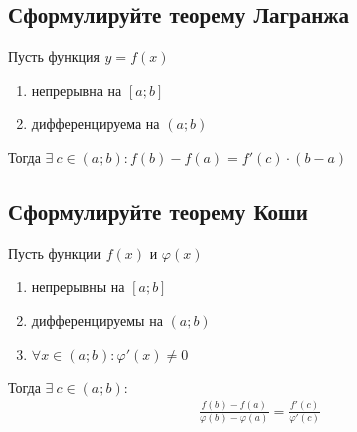 \subsection{Сформулируйте теорему Лагранжа}
\begin{theorem}
	Пусть функция $y=f(x)$
	\begin{enumerate}
		\item непрерывна на $[a;b]$
		\item дифференцируема на $(a;b)$
	\end{enumerate}
	Тогда $\exists\ c \in (a;b)\colon \boxed{f(b) - f(a) = f'(c) \cdot (b-a)}$
\end{theorem}

\subsection{Сформулируйте теорему Коши}
\begin{theorem}
	Пусть функции $f(x)$ и $\varphi (x)$
	\begin{enumerate}
		\item непрерывны на $[a;b]$
		\item дифференцируемы на $(a;b)$
		\item $\forall x \in (a;b)\colon \varphi' (x) \ne 0$
	\end{enumerate}
	Тогда $\exists\ c \in (a;b)\colon$ \vspace{-\topsep}
	\begin{gather*}
		\boxed{\frac{f(b) - f(a)}{\varphi (b) - \varphi (a)} = \frac{f'(c)}{\varphi'(c)}}
	\end{gather*}
\end{theorem}



